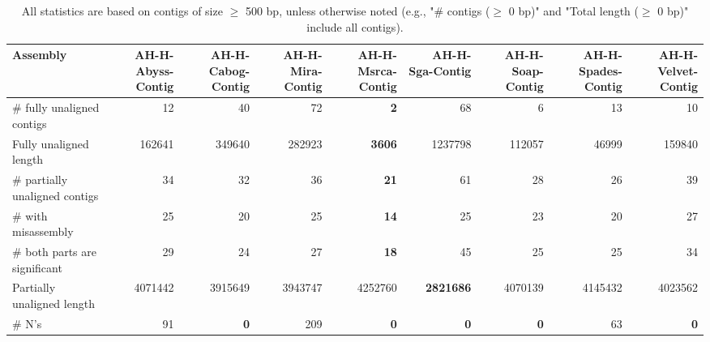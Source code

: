 \documentclass[12pt,a4paper]{article}
\begin{document}
\begin{table}[ht]
\begin{center}
\caption{All statistics are based on contigs of size $\geq$ 500 bp, unless otherwise noted (e.g., "\# contigs ($\geq$ 0 bp)" and "Total length ($\geq$ 0 bp)" include all contigs).}
\begin{tabular}{|l*{8}{|r}|}
\hline
Assembly & AH-H-Abyss-Contig & AH-H-Cabog-Contig & AH-H-Mira-Contig & AH-H-Msrca-Contig & AH-H-Sga-Contig & AH-H-Soap-Contig & AH-H-Spades-Contig & AH-H-Velvet-Contig \\ \hline
\# fully unaligned contigs & 12 & 40 & 72 & {\bf 2} & 68 & 6 & 13 & 10 \\ \hline
Fully unaligned length & 162641 & 349640 & 282923 & {\bf 3606} & 1237798 & 112057 & 46999 & 159840 \\ \hline
\# partially unaligned contigs & 34 & 32 & 36 & {\bf 21} & 61 & 28 & 26 & 39 \\ \hline
\hspace{5mm}\# with misassembly & 25 & 20 & 25 & {\bf 14} & 25 & 23 & 20 & 27 \\ \hline
\hspace{5mm}\# both parts are significant & 29 & 24 & 27 & {\bf 18} & 45 & 25 & 25 & 34 \\ \hline
Partially unaligned length & 4071442 & 3915649 & 3943747 & 4252760 & {\bf 2821686} & 4070139 & 4145432 & 4023562 \\ \hline
\# N's & 91 & {\bf 0} & 209 & {\bf 0} & {\bf 0} & {\bf 0} & 63 & {\bf 0} \\ \hline
\end{tabular}
\end{center}
\end{table}
\end{document}
